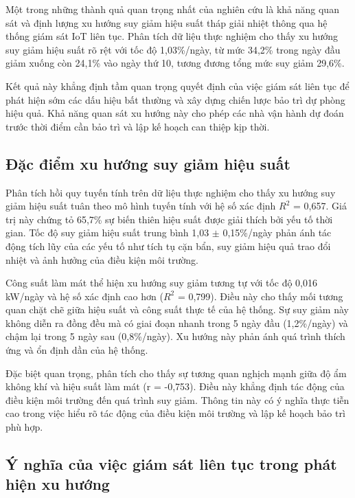 \documentclass[../main.tex]{subfiles}
\begin{document}
Một trong những thành quả quan trọng nhất của nghiên cứu là khả năng quan sát và định lượng xu hướng suy giảm hiệu suất tháp giải nhiệt thông qua hệ thống giám sát IoT liên tục. Phân tích dữ liệu thực nghiệm cho thấy xu hướng suy giảm hiệu suất rõ rệt với tốc độ 1,03\%/ngày, từ mức 34,2\% trong ngày đầu giảm xuống còn 24,1\% vào ngày thứ 10, tương đương tổng mức suy giảm 29,6\%.

Kết quả này khẳng định tầm quan trọng quyết định của việc giám sát liên tục để phát hiện sớm các dấu hiệu bất thường và xây dựng chiến lược bảo trì dự phòng hiệu quả. Khả năng quan sát xu hướng này cho phép các nhà vận hành dự đoán trước thời điểm cần bảo trì và lập kế hoạch can thiệp kịp thời.

\subsection{Đặc điểm xu hướng suy giảm hiệu suất}
\label{sec:degradation_characteristics}

Phân tích hồi quy tuyến tính trên dữ liệu thực nghiệm cho thấy xu hướng suy giảm hiệu suất tuân theo mô hình tuyến tính với hệ số xác định $R^2$ = 0,657. Giá trị này chứng tỏ 65,7\% sự biến thiên hiệu suất được giải thích bởi yếu tố thời gian. Tốc độ suy giảm hiệu suất trung bình 1,03 $\pm$ 0,15\%/ngày phản ánh tác động tích lũy của các yếu tố như tích tụ cặn bẩn, suy giảm hiệu quả trao đổi nhiệt và ảnh hưởng của điều kiện môi trường.

Công suất làm mát thể hiện xu hướng suy giảm tương tự với tốc độ 0,016 kW/ngày và hệ số xác định cao hơn ($R^2$ = 0,799). Điều này cho thấy mối tương quan chặt chẽ giữa hiệu suất và công suất thực tế của hệ thống. Sự suy giảm này không diễn ra đồng đều mà có giai đoạn nhanh trong 5 ngày đầu (1,2\%/ngày) và chậm lại trong 5 ngày sau (0,8\%/ngày). Xu hướng này phản ánh quá trình thích ứng và ổn định dần của hệ thống.

Đặc biệt quan trọng, phân tích cho thấy sự tương quan nghịch mạnh giữa độ ẩm không khí và hiệu suất làm mát (r = -0,753). Điều này khẳng định tác động của điều kiện môi trường đến quá trình suy giảm. Thông tin này có ý nghĩa thực tiễn cao trong việc hiểu rõ tác động của điều kiện môi trường và lập kế hoạch bảo trì phù hợp.

\subsection{Ý nghĩa của việc giám sát liên tục trong phát hiện xu hướng}
\label{sec:continuous_monitoring_significance}
\end{document}
